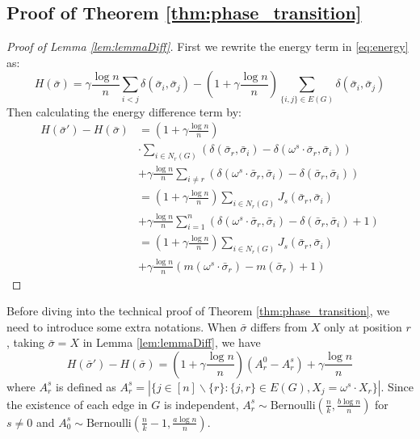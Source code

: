 \documentclass[entropy,article,submit,moreauthors,pdftex]{Definitions/mdpi}
\newcommand{\A}{\frac{a \log n}{n}}
\newcommand{\B}{\frac{b \log n}{n}}
\newcommand{\1}{\mathbbm{1}}
\begin{document}
\subsection{Proof of Theorem \ref{thm:phase_transition}}
\begin{proof}[Proof of Lemma \ref{lem:lemmaDiff}]
	First we rewrite the energy term in \eqref{eq:energy} as:
	\begin{equation*}
	H(\bar{\sigma}) = \gamma \frac{\log n}{n} \sum_{i < j} \delta(\bar{\sigma}_i, \bar{\sigma}_j)
	- (1 + \gamma\frac{\log n}{n}) \sum_{ \{i, j\} \in E(G)} \delta(\bar{\sigma}_i, \bar{\sigma}_j)
	\end{equation*}
	Then calculating the energy difference term by:
	\begin{align*}
	H(\bar{\sigma}') - H(\bar{\sigma}) &= (1 + \gamma\frac{\log n}{n}) \\
	&\cdot \sum_{i \in N_r(G)} (\delta(\bar{\sigma}_r, \bar{\sigma}_i) -
	\delta(\omega^s \cdot \bar{\sigma}_r, \bar{\sigma}_i)) \\
	&+ \gamma \frac{\log n}{n}\sum_{i\neq r}
	( \delta(\omega^s \cdot \bar{\sigma}_r, \bar{\sigma}_i) -
	\delta( \bar{\sigma}_r, \bar{\sigma}_i) ) \\
	& = (1 + \gamma\frac{\log n}{n})\sum_{i \in N_r(G)} J_s(\bar{\sigma}_r, \bar{\sigma}_i) \\
	&+ \gamma \frac{\log n}{n}\sum_{i=1}^n
	( \delta(\omega^s \cdot \bar{\sigma}_r, \bar{\sigma}_i) -
	\delta( \bar{\sigma}_r, \bar{\sigma}_i) +1) \\
	&= (1+\gamma \frac{\log n}{n})\sum_{i \in N_r(G)} J_s(\bar{\sigma}_r, \bar{\sigma}_i)\\
	&+ \gamma \frac{\log n}{n} (m(\omega^s \cdot \bar{\sigma}_r)-m(\bar{\sigma}_r)+1)
	\end{align*}
\end{proof}
Before diving into the technical proof of Theorem \ref{thm:phase_transition}, we need to introduce some extra
notations. When $\bar{\sigma}$ differs from $X$ only at position $r$, taking $\bar{\sigma}=X$ in Lemma \ref{lem:lemmaDiff}, we have
\begin{equation}\label{eq:energy_diff}
H(\bar{\sigma}') - H(\bar{\sigma}) = (1+\gamma \frac{\log n}{n})(A^0_r - A^s_r) + \gamma\frac{\log n}{n}
\end{equation}
where $A^s_r$ is defined as $A^s_r = |\{j \in [n]\backslash \{r\}: \{j, r\} \in E(G), X_j = \omega^s \cdot X_r \}|$.
Since the existence of each edge in $G$ is independent, $A^s_r \sim \textrm{Bernoulli}(\frac{n}{k}, \B ) $ for $s\neq 0$
and $A^s_0 \sim \textrm{Bernoulli}(\frac{n}{k}-1, \A )$.
\end{document}

